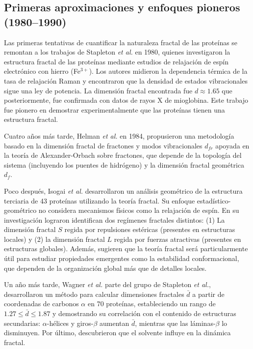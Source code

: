 \subsection{Primeras aproximaciones y enfoques pioneros (1980--1990)}

Las primeras tentativas de cuantificar la naturaleza fractal de las prote\'{i}nas se remontan a los trabajos de Stapleton \textit{et al.}\cite{Stapleton1980} en 1980, quienes investigaron la estructura fractal de las prote\'{i}nas mediante estudios de relajaci\'{o}n de esp\'{i}n electr\'{o}nico con hierro (Fe$^{3+}$). Los autores midieron la dependencia t\'{e}rmica de la tasa de relajaci\'{o}n Raman y encontraron que la densidad de estados vibracionales sigue una ley de potencia. La dimensi\'{o}n fractal encontrada fue $d \approx 1.65$ que posteriormente, fue confirmada con datos de rayos X de mioglobina. Este trabajo fue pionero en demostrar experimentalmente que las prote\'{i}nas tienen una estructura fractal. 

Cuatro años m\'{a}s tarde, Helman \textit{et al.}\cite{Helman1984} en 1984, propusieron una metodolog\'{i}a basado en la dimensi\'{o}n fractal de fractones y modos vibracionales $d_{fr}$ apoyada en la teor\'{i}a de Alexander-Orbach \cite{Alexander1982} sobre fractones, que depende de la topolog\'{i}a del sistema (incluyendo los puentes de hidr\'{o}geno) y la dimensi\'{o}n fractal geom\'{e}trica $d_f$.

Poco despu\'{e}s, Isogai \textit{et al.} \cite{Isogai1984} desarrollaron un an\'{a}lisis geom\'{e}trico de la estructura terciaria de 43 prote\'{i}nas utilizando la teor\'{i}a fractal. Su enfoque  estad\'{i}stico-geom\'{e}trico no considera mecanismos f\'{i}sicos como la relajaci\'{o}n de esp\'{i}n.
En su investigaci\'{o}n lograron identifican dos reg\'{i}menes fractales distintos: (1) La dimensi\'{o}n fractal $S$ regida por repulsiones est\'{e}ricas (presentes en estructuras locales) y (2) la dimensi\'{o}n fractal $L$ regida por fuerzas atractivas (presentes en estructuras globales). Adem\'{a}s, sugieren que la teor\'{i}a fractal ser\'{a} particularmente \'{u}til para estudiar propiedades emergentes como la estabilidad conformacional, que dependen de la organizaci\'{o}n global m\'{a}s que de detalles locales.

Un año m\'{a}s tarde, Wagner \textit{et al.} \cite{Wagner1985} parte  del grupo de Stapleton \textit{et al.}, desarrollaron un m\'{e}todo para calcular dimensiones fractales $\bar{d}$ a partir de coordenadas de carbonos $\alpha$ en 70 prote\'{i}nas, estableciendo un rango de $1.27 \leq \bar{d} \leq 1.87$ y demostrando su correlaci\'{o}n con el contenido de estructuras secundarias: $\alpha$-h\'{e}lices y giros-$\beta$ aumentan $\bar{d}$, mientras que las l\'{a}minas-$\beta$ lo disminuyen. Por \'{u}ltimo, descubrieron que el solvente influye en la din\'{a}mica fractal.


